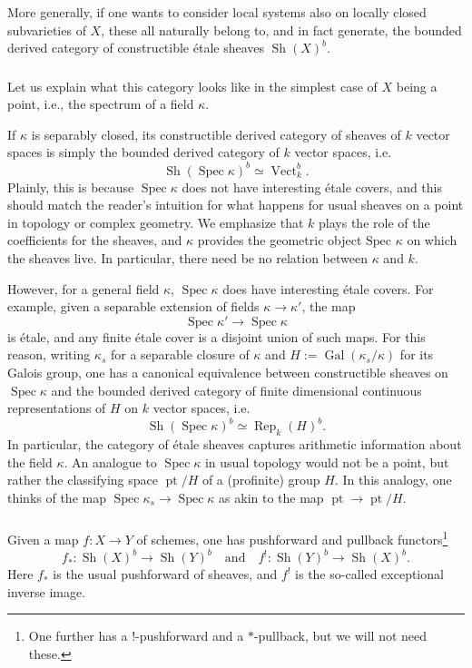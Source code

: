 \documentclass[10pt]{amsart}
\newcommand{\on}{\operatorname}
\theoremstyle{remark}
\newcommand{\Sp}{\on{Spec }}
\newcommand{\Spec}{\text{Spec }}
\numberwithin{equation}{section}
\begin{document}
	
	More generally, if one wants to consider local systems also on locally closed 
	subvarieties of $X$, these all naturally belong to, and in fact generate, the bounded derived 
	category of constructible \'{e}tale sheaves 
	$
	\on{Sh}(X)^b. 
	$
	\subsubsection{} Let us explain what this category looks like in the 
	simplest case of $X$ being a point, i.e., the spectrum of a field $\kappa$. 
	
	If $\kappa$ is separably closed, its constructible derived category of sheaves of $k$ vector spaces is 
	simply the bounded derived category of $k$ vector spaces, i.e. 
	\[
	\on{Sh}(\on{Spec }\kappa)^b \simeq \on{Vect}_k^b.
	\]
	Plainly, this is because $\on{Spec }\kappa$ does not have interesting 
	\'{e}tale covers, and this should match the reader's intuition for what 
	happens for usual sheaves on a point in topology or complex geometry. We emphasize that $k$ plays the role of the coefficients for the sheaves, and $\kappa$ provides the geometric object $\Spec \kappa$ on which the sheaves live. In particular, there need be no relation between $\kappa$ and $k$. 
	
	
	
	
	However, for a general field $\kappa$, $\on{Spec } \kappa$ {does} have 
	interesting \'{e}tale covers. For example, given a separable extension of 
	fields $\kappa \rightarrow \kappa'$, the map 
	\[
	\Sp \kappa' \rightarrow \Sp \kappa
	\]
	is \'{e}tale, and any finite \'{e}tale cover is a disjoint union of such 
	maps. For this reason, writing $\kappa_s$ for a separable closure of 
	$\kappa$ and $H := \on{Gal}(\kappa_s/\kappa)$ for its Galois group, one 
	has a canonical equivalence between constructible sheaves on $\Sp \kappa$ and 
	the bounded derived category of finite dimensional continuous representations of $H$ 
	on $k$ vector spaces, i.e.
	\[
	\on{Sh}(\Sp \kappa)^b \simeq \on{Rep}_k(H)^b. 
	\]
	In particular, the category of \'{e}tale sheaves captures arithmetic 
	information about the field $\kappa$. An analogue to $\Sp \kappa$ in usual 
	topology would not be a point, but rather the classifying space $\on{pt}/H$ 
	of a (profinite) group $H$. In this analogy, one thinks of the map $\Sp 
	\kappa_s \rightarrow \Sp \kappa$ as akin to the map $\on{pt} \rightarrow 
	\on{pt}/H$. 
	
	\label{ss:shvpt}
	
	
	\subsubsection{} Given a map $f: X \rightarrow Y$ of schemes, one has 
	pushforward and pullback functors\footnote{One further has a 
	$!$-pushforward and a $*$-pullback, but we will not need these.} 
	\[
	f_*: \on{Sh}(X)^b \rightarrow \on{Sh}(Y)^b \quad \text{and} \quad f^!: 
	\on{Sh}(Y)^b \rightarrow \on{Sh}(X)^b. 
	\]
	Here $f_*$ is the usual pushforward of sheaves, and $f^!$ is the so-called 
	exceptional inverse image. 
	
\end{document}
